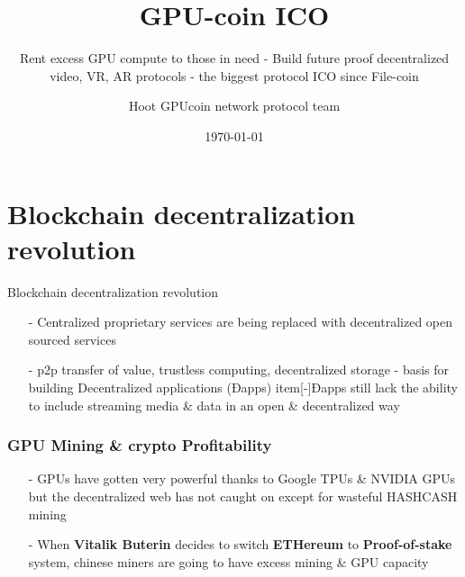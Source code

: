 \documentclass[10pt,handout]{beamer}
\title{ GPU-coin ICO }
\subtitle{Rent excess GPU compute to those in need - Build future proof decentralized video, VR, AR protocols - the biggest protocol ICO since File-coin}
\date{\today}
\author{Hoot GPUcoin network protocol team}
\institute{Hoot GPUcoin Foundation}
\begin{document}
\maketitle


\section{Blockchain decentralization revolution}
\begin{frame}[fragile]{Blockchain decentralization revolution}
 \begin{itemize}[<+-| alert@+>]%
	 
\item[-]Centralized proprietary services are being replaced with decentralized open sourced services
\item[-]p2p transfer of value, trustless computing, decentralized storage - basis for building Decentralized applications (Ðapps)
 item[-]Ðapps still lack the ability to include streaming media \& data in an open \& decentralized way
\end{itemize}

\end{frame}

\begin{frame}[t]\frametitle{GPU Mining \& crypto Profitability}
    
\begin{itemize}[<+-| alert@+>]
\item[-]GPUs have gotten very powerful thanks to Google TPUs \& NVIDIA GPUs but the decentralized web has not caught on except for wasteful HASHCASH mining
\item[-]When \textbf{Vitalik Buterin} decides to switch \textbf{ETHereum} to \textbf{Proof-of-stake} system, chinese miners are going to have excess mining \& GPU capacity
\end{itemize}

\end{frame}
\end{document}
